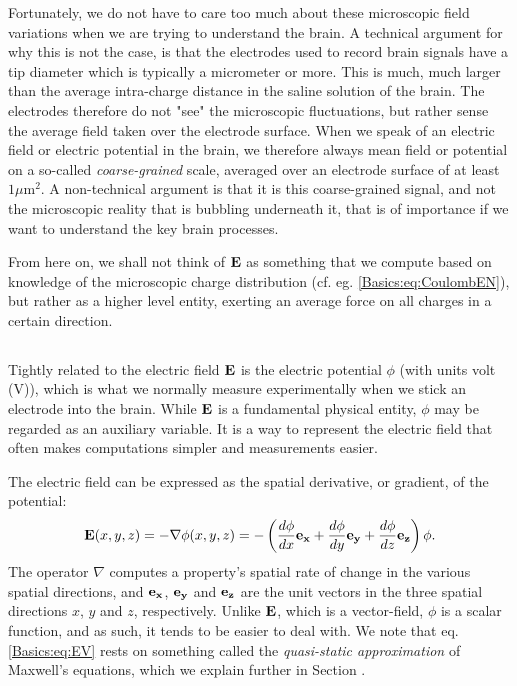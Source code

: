 Fortunately, we do not have to care too much about these microscopic field variations when we are trying to understand the brain. A technical argument for why this is not the case, is that the electrodes used to record brain signals have a tip diameter which is typically a micrometer or more. This is much, much larger than the average intra-charge distance in the saline solution of the brain. The electrodes therefore do not "see" the microscopic fluctuations, but rather sense the average field taken over the electrode surface. When we speak of an electric field or electric potential in the brain, we therefore always mean field or potential on a so-called \textit{coarse-grained} scale, averaged over an electrode surface of at least $1 \mu$m$^2$. A non-technical argument is that it is this coarse-grained signal, and not the microscopic reality that is bubbling underneath it, that is of importance if we want to understand the key brain processes. 

From here on, we shall not think of ${\bf E}$ as something that we compute based on
knowledge of the microscopic charge distribution (cf. eg. \ref{Basics:eq:CoulombEN}), but rather as a higher level entity, exerting an average force on all charges in a certain direction.


\subsection{}
\label{sec:Basics:Potential} 
Tightly related to the electric field ${\bf E}$ is the electric potential $\phi$ (with units volt (V)), which is what we normally measure experimentally when we stick an electrode into the brain. While ${\bf E}$ is a fundamental physical entity, $\phi$ may be regarded as an auxiliary variable. It is a way to represent the electric field that often makes computations simpler and measurements easier. 

The electric field can be expressed as the spatial derivative, or gradient, of the potential:
\begin{equation}
{\bf E}(x,y,z) = - \nabla \phi(x,y,z) = - \left(\frac{d\phi}{dx} {\bf e_x}  + \frac{d\phi}{dy} {\bf e_y} + \frac{d\phi}{dz} {\bf e_z} \right) \phi.
\label{Basics:eq:EV}
\end{equation}
The operator $\nabla$ computes a property's spatial rate of change in the various spatial directions, and ${\bf e_x}$, ${\bf e_y}$ and  ${\bf e_z}$ are the unit vectors in the three spatial directions $x$, $y$ and $z$, respectively. Unlike ${\bf E}$, which is a vector-field, $\phi$ is a scalar function, and as such, it tends to be easier to deal with. We note that eq. \ref{Basics:eq:EV} rests on something called the \textit{quasi-static approximation} of Maxwell's equations, which we explain further in Section \label{sec:Basics:Maxwell}. 

